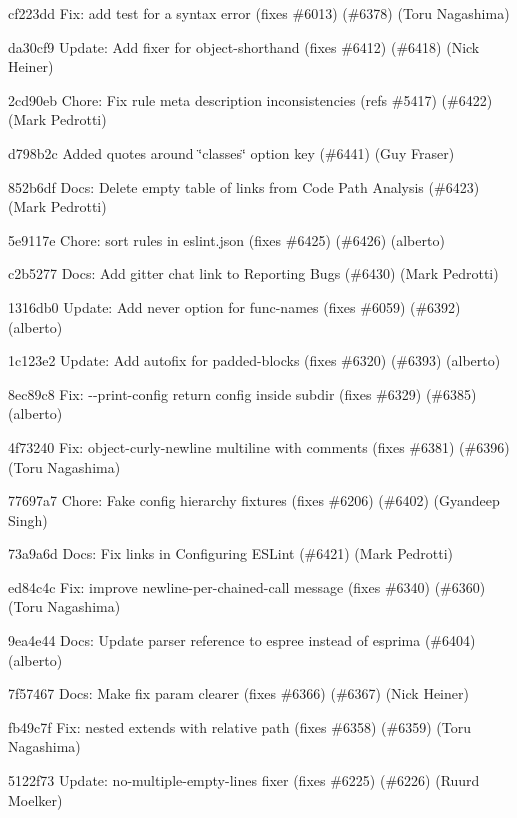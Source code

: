 \begin{DoxyItemize}
\item cf223dd Fix\+: add test for a syntax error (fixes \#6013) (\#6378) (Toru Nagashima)
\item da30cf9 Update\+: Add fixer for object-\/shorthand (fixes \#6412) (\#6418) (Nick Heiner)
\item 2cd90eb Chore\+: Fix rule meta description inconsistencies (refs \#5417) (\#6422) (Mark Pedrotti)
\item d798b2c Added quotes around \char`\"{}classes\char`\"{} option key (\#6441) (Guy Fraser)
\item 852b6df Docs\+: Delete empty table of links from Code Path Analysis (\#6423) (Mark Pedrotti)
\item 5e9117e Chore\+: sort rules in eslint.\+json (fixes \#6425) (\#6426) (alberto)
\item c2b5277 Docs\+: Add gitter chat link to Reporting Bugs (\#6430) (Mark Pedrotti)
\item 1316db0 Update\+: Add {\ttfamily never} option for {\ttfamily func-\/names} (fixes \#6059) (\#6392) (alberto)
\item 1c123e2 Update\+: Add autofix for {\ttfamily padded-\/blocks} (fixes \#6320) (\#6393) (alberto)
\item 8ec89c8 Fix\+: {\ttfamily -\/-\/print-\/config} return config inside subdir (fixes \#6329) (\#6385) (alberto)
\item 4f73240 Fix\+: {\ttfamily object-\/curly-\/newline} multiline with comments (fixes \#6381) (\#6396) (Toru Nagashima)
\item 77697a7 Chore\+: Fake config hierarchy fixtures (fixes \#6206) (\#6402) (Gyandeep Singh)
\item 73a9a6d Docs\+: Fix links in Configuring E\+S\+Lint (\#6421) (Mark Pedrotti)
\item ed84c4c Fix\+: improve {\ttfamily newline-\/per-\/chained-\/call} message (fixes \#6340) (\#6360) (Toru Nagashima)
\item 9ea4e44 Docs\+: Update parser reference to {\ttfamily espree} instead of {\ttfamily esprima} (\#6404) (alberto)
\item 7f57467 Docs\+: Make {\ttfamily fix} param clearer (fixes \#6366) (\#6367) (Nick Heiner)
\item fb49c7f Fix\+: nested {\ttfamily extends} with relative path (fixes \#6358) (\#6359) (Toru Nagashima)
\item 5122f73 Update\+: no-\/multiple-\/empty-\/lines fixer (fixes \#6225) (\#6226) (Ruurd Moelker)

\end{DoxyItemize}

